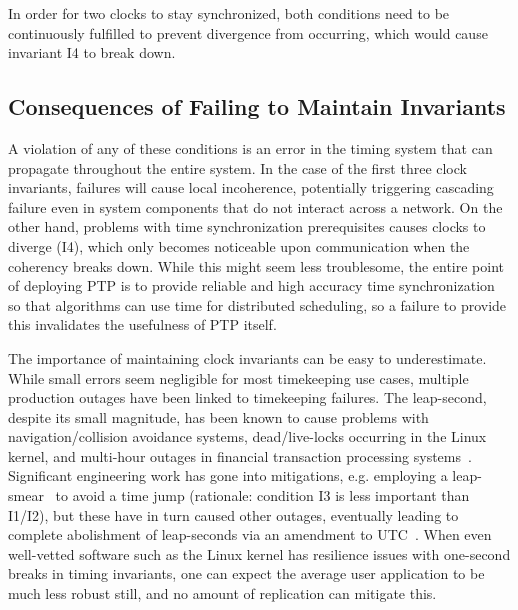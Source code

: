 In order for two clocks to stay synchronized, both conditions need to be continuously fulfilled to prevent divergence from occurring, which would cause invariant I4 to break down.

\subsection{Consequences of Failing to Maintain Invariants}
A violation of any of these conditions is an error in the timing system that can propagate throughout the entire system.
In the case of the first three clock invariants, failures will cause local incoherence, potentially triggering cascading failure even in system components that do not interact across a network. On the other hand, problems with time synchronization prerequisites causes clocks to diverge (I4), which only becomes noticeable upon communication when the coherency breaks down.
While this might seem less troublesome, the entire point of deploying PTP is to provide reliable and high accuracy time synchronization so that algorithms can use time for distributed scheduling, so a failure to provide this invalidates the usefulness of PTP itself.

The importance of maintaining clock invariants can be easy to underestimate. While small errors seem negligible for most timekeeping use cases, multiple production outages have been linked to timekeeping failures.
The leap-second, despite its small magnitude, has been known to cause problems with navigation/collision avoidance systems, dead/live-locks occurring in the Linux kernel, and multi-hour outages in financial transaction processing systems~\cite{leap-seconds-recap}.
Significant engineering work has gone into mitigations, e.g. employing a leap-smear~\cite{leap-second-google, leap-second-technical-aspects} to avoid a time jump (rationale: condition I3 is less important than I1/I2), but these have in turn caused other outages,
eventually leading to complete abolishment of leap-seconds via an amendment to UTC~\cite{leap-second-resolution,leap-second-facebook-abolish}.
When even well-vetted software such as the Linux kernel has resilience issues with one-second breaks in timing invariants, one can expect the average user application to be much less robust still, and no amount of replication can mitigate this.

